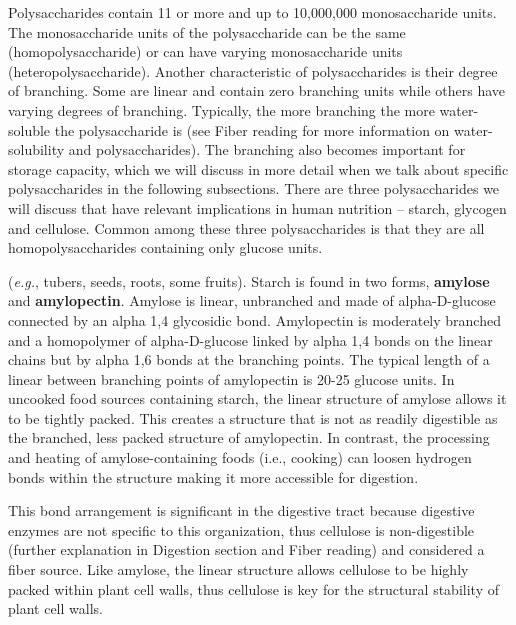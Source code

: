 \documentclass{tufte-handout}
\begin{document}
Polysaccharides contain 11 or more and up to 10,000,000 monosaccharide units. The monosaccharide units of the polysaccharide can be the same (homopolysaccharide) or can have varying monosaccharide units  (heteropolysaccharide). Another characteristic of polysaccharides is their degree of branching. Some are linear and contain zero branching units while others have varying degrees of branching. Typically, the more branching the more water-soluble the polysaccharide is (see Fiber reading for more information on water-solubility and polysaccharides). The branching also becomes important for storage capacity, which we will discuss in more detail when we talk about specific polysaccharides in the following subsections. There are three polysaccharides we will discuss that have relevant implications in human nutrition -- starch, glycogen and cellulose. Common among these three polysaccharides is that they are all homopolysaccharides containing only glucose units.

 (\textit{e.g.}, tubers, seeds, roots, some fruits). Starch is found in two forms, \textbf{amylose} and \textbf{amylopectin}. Amylose is linear, unbranched and made of alpha-D-glucose connected by an alpha 1,4 glycosidic bond. Amylopectin is moderately branched and a homopolymer of alpha-D-glucose linked by alpha 1,4 bonds on the linear chains but by alpha 1,6 bonds at the branching points. The typical length of a linear  between branching points of amylopectin is 20-25 glucose units. In uncooked food sources containing starch, the linear structure of amylose allows it to be tightly packed. This creates a structure that is not as readily digestible as the branched, less packed structure of amylopectin. In contrast, the processing and heating of amylose-containing foods (i.e., cooking) can loosen hydrogen bonds within the structure making it more accessible for digestion.

 This bond arrangement is significant in the digestive
tract because digestive enzymes are not specific to this organization, thus cellulose is non-digestible (further explanation in Digestion section and Fiber reading) and considered a fiber source. Like amylose, the linear structure allows cellulose to be highly packed within plant cell walls, thus cellulose is key for the structural stability of plant cell walls.
\end{document}
